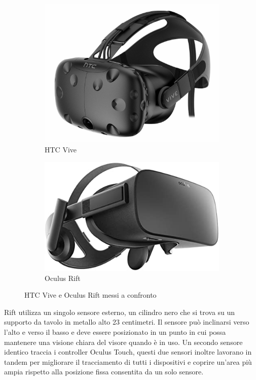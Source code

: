 \begin{figure}[H]
    \centering
    \begin{subfigure}[b]{0.4\textwidth}
        \centering
        \includegraphics[width=\textwidth]{images/HTC-Vive.JPG}
        \caption{HTC Vive}
        \label{fig:figure16a}
    \end{subfigure}
    \begin{subfigure}[b]{0.4\textwidth}
        \centering
        \includegraphics[width=\textwidth]{images/Oculus-Rift.jpg}
        \caption{Oculus Rift}
        \label{fig:figure16b}
    \end{subfigure}
       \caption{HTC Vive e Oculus Rift messi a confronto}
       \label{fig:figure16}
\end{figure}

Rift utilizza un singolo sensore esterno, un cilindro nero che si trova su un supporto da tavolo in metallo alto 23 centimetri. Il sensore può inclinarsi verso l'alto e verso il basso e deve essere posizionato in un punto in cui possa mantenere una visione chiara del visore quando è in uso. Un secondo sensore identico traccia i controller Oculus Touch, questi due sensori inoltre lavorano in tandem per migliorare il tracciamento di tutti i dispositivi e coprire un'area più ampia rispetto alla posizione fissa consentita da un solo sensore. 

